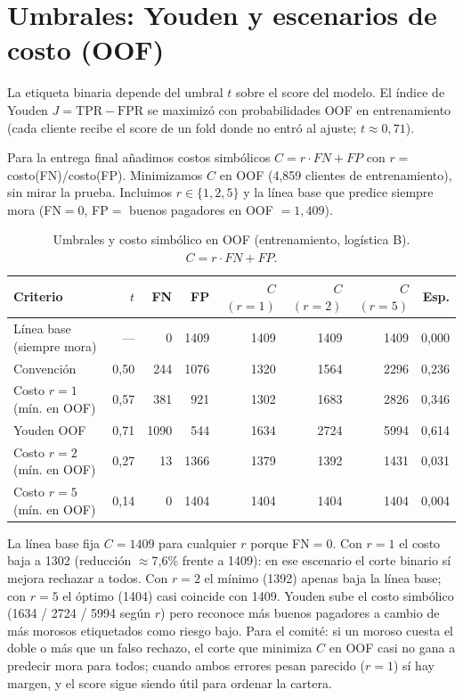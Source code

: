 \documentclass[11pt]{article}
\begin{document}
\section{Umbrales: Youden y escenarios de costo (OOF)}

La etiqueta binaria depende del umbral $t$ sobre el score del modelo. El índice de Youden $J = \mathrm{TPR} - \mathrm{FPR}$ se maximizó con probabilidades OOF en entrenamiento (cada cliente recibe el score de un fold donde no entró al ajuste; $t \approx 0{,}71$).

Para la entrega final añadimos costos simbólicos $C = r \cdot FN + FP$ con $r =$ costo(FN)/costo(FP). Minimizamos $C$ en OOF (4{,}859 clientes de entrenamiento), sin mirar la prueba. Incluimos $r \in \{1, 2, 5\}$ y la línea base que predice siempre mora (FN$=0$, FP$=$ buenos pagadores en OOF $=1{,}409$).

\begin{table}[H]
\centering
\caption{Umbrales y costo simbólico en OOF (entrenamiento, logística B). $C = r\cdot FN + FP$.}
\label{tab:costos_oof}
\footnotesize
\begin{tabular}{@{}lrrrrrrr@{}}
\toprule
\textbf{Criterio} & \textbf{$t$} & \textbf{FN} & \textbf{FP} & \textbf{$C$ $(r{=}1)$} & \textbf{$C$ $(r{=}2)$} & \textbf{$C$ $(r{=}5)$} & \textbf{Esp.} \\
\midrule
Línea base (siempre mora) & --- & 0 & 1409 & 1409 & 1409 & 1409 & 0,000 \\
Convención & 0,50 & 244 & 1076 & 1320 & 1564 & 2296 & 0,236 \\
Costo $r=1$ (mín. en OOF) & 0,57 & 381 & 921 & 1302 & 1683 & 2826 & 0,346 \\
Youden OOF & 0,71 & 1090 & 544 & 1634 & 2724 & 5994 & 0,614 \\
Costo $r=2$ (mín. en OOF) & 0,27 & 13 & 1366 & 1379 & 1392 & 1431 & 0,031 \\
Costo $r=5$ (mín. en OOF) & 0,14 & 0 & 1404 & 1404 & 1404 & 1404 & 0,004 \\
\bottomrule
\end{tabular}
\end{table}

La línea base fija $C = 1409$ para cualquier $r$ porque FN$=0$. Con $r=1$ el costo baja a 1302 (reducción $\approx$7,6\% frente a 1409): en ese escenario el corte binario sí mejora rechazar a todos. Con $r=2$ el mínimo (1392) apenas baja la línea base; con $r=5$ el óptimo (1404) casi coincide con 1409. Youden sube el costo simbólico (1634 / 2724 / 5994 según $r$) pero reconoce más buenos pagadores a cambio de más morosos etiquetados como riesgo bajo. Para el comité: si un moroso cuesta el doble o más que un falso rechazo, el corte que minimiza $C$ en OOF casi no gana a predecir mora para todos; cuando ambos errores pesan parecido ($r=1$) sí hay margen, y el score sigue siendo útil para ordenar la cartera.
\end{document}
